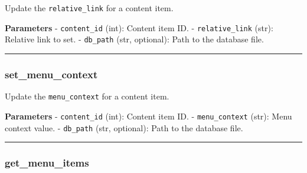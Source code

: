 \begin{Shaded}
\begin{Highlighting}[]
\OperatorTok{=}\NormalTok{)}
\end{Highlighting}
\end{Shaded}

Update the \texttt{relative\_link} for a content item.

\textbf{Parameters} - \texttt{content\_id} (int): Content item ID. -
\texttt{relative\_link} (str): Relative link to set. - \texttt{db\_path}
(str, optional): Path to the database file.

\begin{center}\rule{0.5\linewidth}{0.5pt}\end{center}

\subsubsection{set\_menu\_context}\label{set_menu_context}

\begin{Shaded}
\begin{Highlighting}[]
\OperatorTok{=}\NormalTok{)}
\end{Highlighting}
\end{Shaded}

Update the \texttt{menu\_context} for a content item.

\textbf{Parameters} - \texttt{content\_id} (int): Content item ID. -
\texttt{menu\_context} (str): Menu context value. - \texttt{db\_path}
(str, optional): Path to the database file.

\begin{center}\rule{0.5\linewidth}{0.5pt}\end{center}

\subsubsection{get\_menu\_items}\label{get_menu_items}

\begin{Shaded}
\begin{Highlighting}[]
\OperatorTok{=}\NormalTok{)}
\end{Highlighting}
\end{Shaded}

